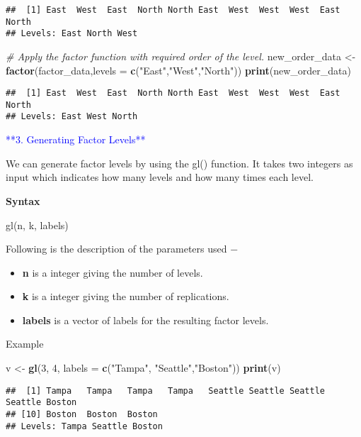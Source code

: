 \documentclass[
]{article}
\newenvironment{Shaded}{\begin{snugshade}}{\end{snugshade}}
\newcommand{\AttributeTok}[1]{\textcolor[rgb]{0.13,0.29,0.53}{#1}}
\newcommand{\CommentTok}[1]{\textcolor[rgb]{0.56,0.35,0.01}{\textit{#1}}}
\newcommand{\DecValTok}[1]{\textcolor[rgb]{0.00,0.00,0.81}{#1}}
\newcommand{\FunctionTok}[1]{\textcolor[rgb]{0.13,0.29,0.53}{\textbf{#1}}}
\newcommand{\NormalTok}[1]{#1}
\newcommand{\OtherTok}[1]{\textcolor[rgb]{0.56,0.35,0.01}{#1}}
\newcommand{\StringTok}[1]{\textcolor[rgb]{0.31,0.60,0.02}{#1}}
\providecommand{\tightlist}{%
  \setlength{\itemsep}{0pt}\setlength{\parskip}{0pt}}
\begin{document}
\begin{verbatim}
##  [1] East  West  East  North North East  West  West  West  East  North
## Levels: East North West
\end{verbatim}

\begin{Shaded}
\begin{Highlighting}[]
\CommentTok{\# Apply the factor function with required order of the level.}
\NormalTok{new\_order\_data }\OtherTok{\textless{}{-}} \FunctionTok{factor}\NormalTok{(factor\_data,}\AttributeTok{levels =} \FunctionTok{c}\NormalTok{(}\StringTok{"East"}\NormalTok{,}\StringTok{"West"}\NormalTok{,}\StringTok{"North"}\NormalTok{))}
\FunctionTok{print}\NormalTok{(new\_order\_data)}
\end{Highlighting}
\end{Shaded}

\begin{verbatim}
##  [1] East  West  East  North North East  West  West  West  East  North
## Levels: East West North
\end{verbatim}

\textcolor{blue}{**3. Generating Factor Levels**}

We can generate factor levels by using the gl() function. It takes two
integers as input which indicates how many levels and how many times
each level.

\textbf{Syntax}

gl(n, k, labels)

Following is the description of the parameters used −

\begin{itemize}
\tightlist
\item
  \textbf{n} is a integer giving the number of levels.
\item
  \textbf{k} is a integer giving the number of replications.
\item
  \textbf{labels} is a vector of labels for the resulting factor levels.
\end{itemize}

Example

\begin{Shaded}
\begin{Highlighting}[]
\NormalTok{v }\OtherTok{\textless{}{-}} \FunctionTok{gl}\NormalTok{(}\DecValTok{3}\NormalTok{, }\DecValTok{4}\NormalTok{, }\AttributeTok{labels =} \FunctionTok{c}\NormalTok{(}\StringTok{"Tampa"}\NormalTok{, }\StringTok{"Seattle"}\NormalTok{,}\StringTok{"Boston"}\NormalTok{))}
\FunctionTok{print}\NormalTok{(v)}
\end{Highlighting}
\end{Shaded}

\begin{verbatim}
##  [1] Tampa   Tampa   Tampa   Tampa   Seattle Seattle Seattle Seattle Boston 
## [10] Boston  Boston  Boston 
## Levels: Tampa Seattle Boston
\end{verbatim}
\end{document}
